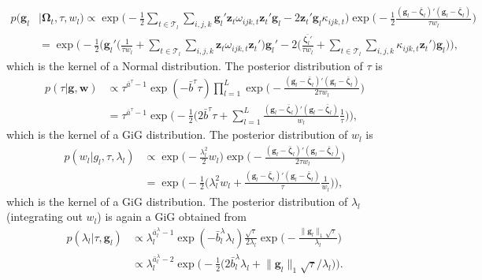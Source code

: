 \documentclass[12pt,a4paper]{article}
\newcommand*{\norm}[1]{\big\lVert#1\big\rVert}		%
\theoremstyle{custom}
\begin{document}
\begin{align*}
p(\mathbf{g}_l & | \boldsymbol{\Omega}_t, \tau, w_l) \propto \exp\Big( -\frac{1}{2} \sum_{t\in\mathcal{T}_l} \sum_{i,j,k} \mathbf{g}_l' \mathbf{z}_t \omega_{ijk,t} \mathbf{z}_t' \mathbf{g}_l - 2 \mathbf{z}_t' \mathbf{g}_l \kappa_{ijk,t} \Big) \exp\Big( -\frac{1}{2} \frac{(\mathbf{g}_l-\bar{\boldsymbol{\zeta}}_l)' (\mathbf{g}_l-\bar{\boldsymbol{\zeta}}_l)}{\tau w_l} \Big) \\
 & = \exp\Bigg( -\frac{1}{2} \Big( \mathbf{g}_l' \bigg( \frac{1}{\tau w_l} + \sum_{t\in\mathcal{T}_l} \sum_{i,j,k} \mathbf{z}_t \omega_{ijk,t} \mathbf{z}_t' \Big) \mathbf{g}_l' - 2 \bigg( \frac{\bar{\boldsymbol{\zeta}_l'}}{\tau w_l} + \sum_{t\in\mathcal{T}_l} \sum_{i,j,k} \kappa_{ijk,t} \mathbf{z}_t' \bigg) \mathbf{g}_l \bigg) \Bigg),
\end{align*}
which is the kernel of a Normal distribution. The posterior distribution of $\tau$ is
\begin{align*}
p(\tau | \mathbf{g}, \mathbf{w}) & \propto \tau^{\bar{a}^\tau-1} \exp(-\bar{b}^\tau \tau) \prod_{l=1}^L \exp\Big( -\frac{(\mathbf{g}_l-\bar{\boldsymbol{\zeta}}_l)' (\mathbf{g}_l-\bar{\boldsymbol{\zeta}}_l)}{2\tau w_l} \Big) \\
 & = \tau^{\bar{a}^\tau-1} \exp\Big( -\frac{1}{2} \Big( 2\bar{b}^\tau \tau + \sum_{l=1}^L \frac{(\mathbf{g}_l-\bar{\boldsymbol{\zeta}}_l)' (\mathbf{g}_l-\bar{\boldsymbol{\zeta}}_l)}{w_l} \frac{1}{\tau} \Big) \Big),
\end{align*}
which is the kernel of a GiG distribution. The posterior distribution of $w_l$ is
\begin{align*}
p(w_l |g_l,\tau,\lambda_l) & \propto \exp\Big( -\frac{\lambda_l^2}{2} w_l \Big) \exp\Big( -\frac{(\mathbf{g}_l-\bar{\boldsymbol{\zeta}}_l)' (\mathbf{g}_l-\bar{\boldsymbol{\zeta}}_l)}{2\tau w_l} \Big) \\
 & = \exp\Big( -\frac{1}{2} \Big( \lambda_l^2 w_l + \frac{(\mathbf{g}_l-\bar{\boldsymbol{\zeta}}_l)' (\mathbf{g}_l-\bar{\boldsymbol{\zeta}}_l)}{\tau} \frac{1}{w_l} \Big) \Big),
\end{align*}
which is the kernel of a GiG distribution. The posterior distribution of $\lambda_l$ (integrating out $w_l$) is again a GiG obtained from
\begin{align*}
p(\lambda_l | \tau, \mathbf{g}_l) & \propto \lambda_l^{\bar{a}_l^\lambda-1} \exp(-\bar{b}_l^\lambda \lambda_l) \frac{\sqrt{\tau}}{2\lambda_l} \exp\Big( -\frac{\norm{\mathbf{g}_l}_1 \sqrt{\tau}}{\lambda_l} \Big) \\
 & \propto \lambda_l^{\bar{a}_l^\lambda-2} \exp\Big( -\frac{1}{2} \Big( 2\bar{b}_l^\lambda \lambda_l + \norm{\mathbf{g}_l}_1 \sqrt{\tau} \big/ \lambda_l \Big) \Big).
\end{align*}
\end{document}
